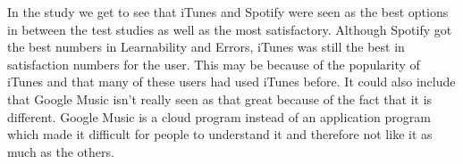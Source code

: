 \documentclass{article}
\begin{document}
In the study we get to see that iTunes and Spotify were seen as the best options in between the test studies as well as the most satisfactory. Although Spotify got the best numbers in Learnability and Errors, iTunes was still the best in satisfaction numbers for the user. This may be because of the popularity of iTunes and that many of these users had used iTunes before. It could also include that Google Music isn’t really seen as that great because of the fact that it is different. Google Music is a cloud program instead of an application program which made it difficult for people to understand it and therefore not like it as much as the others.
\end{document}
